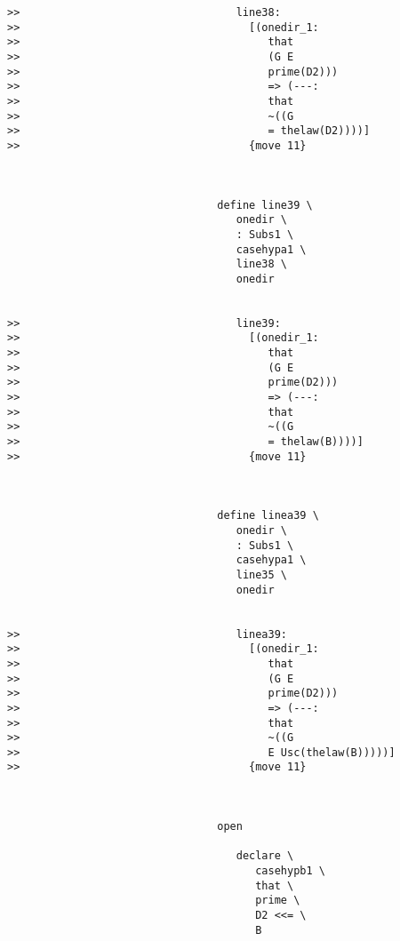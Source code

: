 \documentclass[12pt]{article}
\begin{document}
\begin{verbatim}
>>                                  line38:
>>                                    [(onedir_1:
>>                                       that
>>                                       (G E
>>                                       prime(D2)))
>>                                       => (---:
>>                                       that
>>                                       ~((G
>>                                       = thelaw(D2))))]
>>                                    {move 11}



                                 define line39 \
                                    onedir \
                                    : Subs1 \
                                    casehypa1 \
                                    line38 \
                                    onedir


>>                                  line39:
>>                                    [(onedir_1:
>>                                       that
>>                                       (G E
>>                                       prime(D2)))
>>                                       => (---:
>>                                       that
>>                                       ~((G
>>                                       = thelaw(B))))]
>>                                    {move 11}



                                 define linea39 \
                                    onedir \
                                    : Subs1 \
                                    casehypa1 \
                                    line35 \
                                    onedir


>>                                  linea39:
>>                                    [(onedir_1:
>>                                       that
>>                                       (G E
>>                                       prime(D2)))
>>                                       => (---:
>>                                       that
>>                                       ~((G
>>                                       E Usc(thelaw(B)))))]
>>                                    {move 11}



                                 open

                                    declare \
                                       casehypb1 \
                                       that \
                                       prime \
                                       D2 <<= \
                                       B


\end{verbatim}
\end{document}
